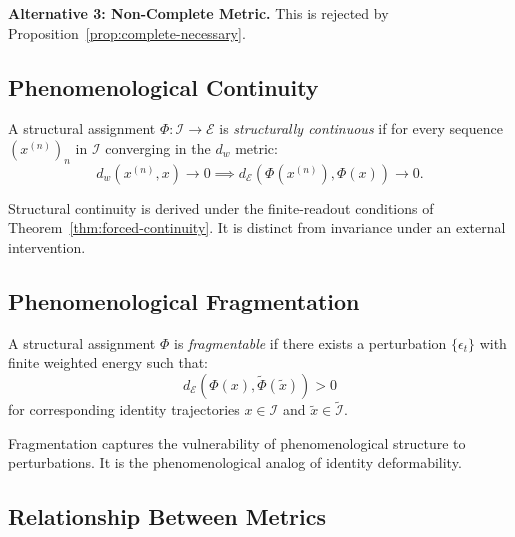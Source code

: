 \textbf{Alternative 3: Non-Complete Metric.}
This is rejected by Proposition~\ref{prop:complete-necessary}.

\subsection{Phenomenological Continuity}

\begin{definition}\label{def:phen-continuity}
A structural assignment $\Phi: \mathcal{I} \to \mathcal{E}$ is \textit{structurally continuous} if for every sequence $(x^{(n)})_n$ in $\mathcal{I}$ converging in the $d_w$ metric:
\begin{equation}
    d_w(x^{(n)}, x) \to 0 \implies d_\mathcal{E}(\Phi(x^{(n)}), \Phi(x)) \to 0.
\end{equation}
\end{definition}

\begin{remark}
Structural continuity is derived under the finite-readout conditions of Theorem~\ref{thm:forced-continuity}. It is distinct from invariance under an external intervention.
\end{remark}

\subsection{Phenomenological Fragmentation}

\begin{definition}\label{def:fragmentation}
A structural assignment $\Phi$ is \textit{fragmentable} if there exists a perturbation $\{\epsilon_t\}$ with finite weighted energy such that:
\begin{equation}
    d_\mathcal{E}(\Phi(x), \tilde{\Phi}(\tilde{x})) > 0
\end{equation}
for corresponding identity trajectories $x \in \mathcal{I}$ and $\tilde{x} \in \tilde{\mathcal{I}}$.
\end{definition}

\begin{remark}
Fragmentation captures the vulnerability of phenomenological structure to perturbations. It is the phenomenological analog of identity deformability.
\end{remark}

\subsection{Relationship Between Metrics}

